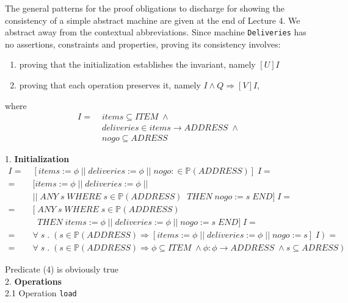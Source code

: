 \documentclass[11pt]{article}
\begin{document}
The general patterns for the proof obligations to discharge for showing the consistency of a simple abstract machine are given at the end of Lecture 4. We abstract away from the contextual abbreviations. Since machine \texttt{Deliveries} has no assertions, constraints and properties, proving its consistency involves:
\begin{enumerate}
  \item proving that the initialization establishes the invariant, namely $[U]I$
	\item proving that each operation preserves it, namely  $I \wedge Q \Rightarrow [V]I$,
\end{enumerate}
where
\begin{align}
I = \; & items \subseteq ITEM \; \wedge\\
       & deliveries \in items \rightarrow ADDRESS \; \wedge \\
			 & nogo \subseteq ADRESS
\end{align}


1. \textbf{Initialization}
  \begin{align}
     [U]I = \; & [items := \phi \; || \; deliveries := \phi \; || \; nogo :\in \mathbb{P}(ADDRESS)] \; I = \nonumber \\	  
		      = \; & [items := \phi \; || \; deliveries := \phi \; || \; \nonumber \\
					  \; & || \; ANY \; s \; WHERE \; s \in \mathbb{P}(ADDRESS) \;\; THEN \; nogo := s \; END] \; I = \nonumber \\	  
					= \; & [\; ANY \; s \; WHERE \; s \in \mathbb{P}(ADDRESS)  \nonumber \\
					  \; & \;\; THEN \; items := \phi \; || \; deliveries := \phi \; || \; nogo := s \; END] \; I = \nonumber \\
					= \; & \forall \; s \; . \; ( s \in \mathbb{P}(ADDRESS)\Rightarrow [items := \phi \; || \; deliveries := \phi \; || \; nogo := s] \; I )             =	\nonumber  \\
          = \; & \forall \; s \; . \; ( s \in \mathbb{P}(ADDRESS) \Rightarrow \phi \subseteq ITEM \; \wedge \phi : \phi \rightarrow ADDRESS \;              \wedge s \subseteq ADRESS )
   \end{align}

Predicate (4) is obviously true \\

2. \textbf{Operations} \\

2.1 Operation \texttt{load}
\end{document}

